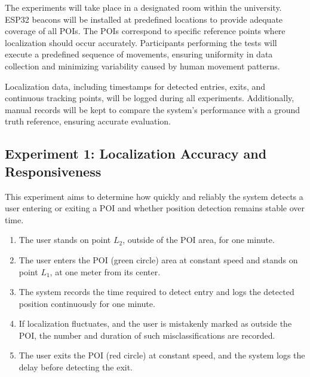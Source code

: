 The experiments will take place in a designated room within the university. ESP32 beacons will be installed at predefined locations to provide adequate coverage of all POIs. The POIs correspond to specific reference points where localization should occur accurately. Participants performing the tests will execute a predefined sequence of movements, ensuring uniformity in data collection and minimizing variability caused by human movement patterns.

Localization data, including timestamps for detected entries, exits, and continuous tracking points, will be logged during all experiments. Additionally, manual records will be kept to compare the system's performance with a ground truth reference, ensuring accurate evaluation.

\subsection{Experiment 1: Localization Accuracy and Responsiveness}

This experiment aims to determine how quickly and reliably the system detects a user entering or exiting a POI and whether position detection remains stable over time.

\begin{enumerate}
    \item The user stands on point $L_2$, outside of the POI area, for one minute.
    \item The user enters the POI (green circle) area at constant speed and stands on point $L_1$, at one meter from its center.
    \item The system records the time required to detect entry and logs the detected position continuously for one minute.
    \item If localization fluctuates, and the user is mistakenly marked as outside the POI, the number and duration of such misclassifications are recorded.
    \item The user exits the POI (red circle) at constant speed, and the system logs the delay before detecting the exit.
\end{enumerate}

